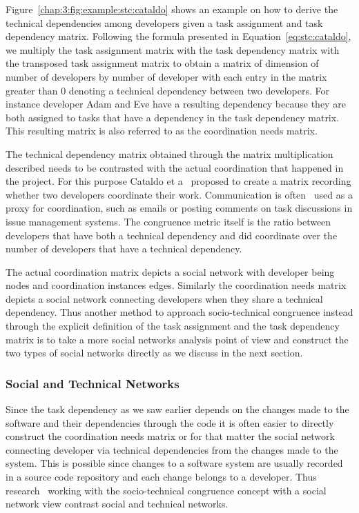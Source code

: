 Figure~\ref{chap:3:fig:example:stc:cataldo} shows an example on how to derive the technical dependencies among developers given a task assignment and task dependency matrix.
Following the formula presented in Equation~\ref{eq:stc:cataldo}, we multiply the task assignment matrix with the task dependency matrix with the transposed task assignment matrix to obtain a matrix of dimension of number of developers by number of developer with each entry in the matrix greater than 0 denoting a technical dependency between two developers.
For instance developer Adam and Eve have a resulting dependency because they are both assigned to tasks that have a dependency in the task dependency matrix. 
This resulting matrix is also referred to as the coordination needs matrix.

The technical dependency matrix obtained through the matrix multiplication described needs to be contrasted with the actual coordination that happened in the project.
For this purpose Cataldo et a~\cite{cataldo:cscw:2006} proposed to create a matrix recording whether two developers coordinate their work.
Communication is often~\cite{cataldo:cscw:2006,kwan:tse:2011,valetto:msr:2007,ducheneaut:cscw:2005,ehrlich:stc:2008,wolf:icse:2009} used as a proxy for coordination, such as emails or posting comments on task discussions in issue management systems.
The congruence metric itself is the ratio between developers that have both a technical dependency and did coordinate over the number of developers that have a technical dependency.

The actual coordination matrix depicts a social network with developer being nodes and coordination instances edges.
Similarly the coordination needs matrix depicts a social network connecting developers when they share a technical dependency.
Thus another method to approach socio-technical congruence instead through the explicit definition of the task assignment and the task dependency matrix is to take a more social networks analysis point of view and construct the two types of social networks directly as we discuss in the next section.

\subsubsection{Social and Technical Networks}
Since the task dependency as we saw earlier depends on the changes made to the software and their dependencies through the code it is often easier to directly construct the coordination needs matrix or for that matter the social network connecting developer via technical dependencies from the changes made to the system.
This is possible since changes to a software system are usually recorded in a source code repository and each change belongs to a developer.
Thus research~\cite{cataldo:cscw:2006,kwan:tse:2011,valetto:msr:2007,ducheneaut:cscw:2005,ehrlich:stc:2008} working with the socio-technical congruence concept with a social network view contrast social and technical networks.

